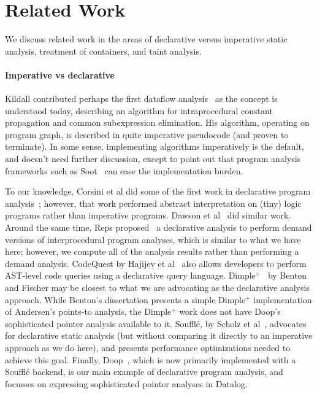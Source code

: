 \section{Related Work}
\label{sec:related}

We discuss related work in the areas of declarative versus imperative static analysis,
treatment of containers, and taint analysis.

\paragraph{Imperative vs declarative}
Kildall contributed perhaps the first dataflow analysis~\cite{kildall73:_unified_approac_global_progr_optim} as the concept is understood today, describing an algorithm for intraprocedural constant propagation and common subexpression elimination. His algorithm, operating on program graph, is described in quite imperative pseudocode (and proven to terminate). In some sense, implementing algorithms imperatively is the default, and doesn't need further discussion, except to point out that program analysis frameworks such as Soot~\cite{Vallee-Rai:1999:SJB:781995.782008} can ease the implementation burden.

To our knowledge, Corsini et al did some of the first work in declarative program analysis~\cite{corsini93:_effic}; however, that work performed abstract interpretation on (tiny) logic programs rather than imperative programs. Dawson et al~\cite{dawson96:_pract_progr_analy_using_gener} did similar work. Around the same time, Reps proposed~\cite{Reps1995} a declarative analysis to perform demand versions of interprocedural program analyses, which is similar to what we have here; however, we compute all of the analysis results rather than performing a demand analysis. CodeQuest by Hajijev et al~\cite{hajiyev06} also allows developers to perform AST-level code queries using a declarative query language. {\sc Dimple$^+$}~\cite{benton07:_inter_scalab_declar_progr_analy}\cite[Chapter 3]{benton08:_fast_effec_progr_analy_objec_level_paral} by Benton and Fischer may be closest to what we are advocating as the declarative analysis approach. While Benton's dissertation presents a simple {\sc Dimple$^+$} implementation of Andersen's points-to analysis, the {\sc Dimple$^+$} work does not have Doop's sophisticated pointer analysis available to it. Soufflé, by Scholz et al~\cite{scholz16:_fast_large_scale_progr_analy_datal}, advocates for declarative static analysis (but without comparing it directly to an imperative approach as we do here), and presents performance optimizations needed to achieve this goal.
Finally, Doop~\cite{bravenboer09:_stric_declar_specif_sophis_point_analy}, which is now primarily implemented with a Soufflé backend, is our main example of declarative program analysis, and focusses on expressing sophisticated pointer analyses in Datalog. 

